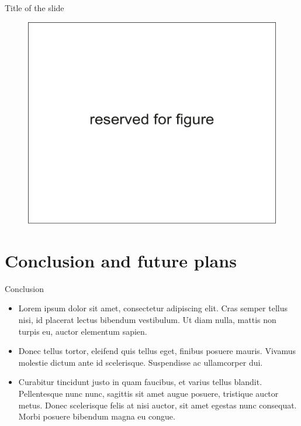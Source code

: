 \documentclass[russian,12pt,aspectratio=169,xcolor=table]{beamer}
\begin{document}
\begin{frame}{Title of the slide}
\begin{minipage}{.32\textwidth}
  \end{minipage}
  \begin{minipage}{.32\textwidth}
    \begin{figure}
      \centering
      \includegraphics[width=\textwidth]{img/5}
    \end{figure}
  \end{minipage}
\end{frame}


\section{Conclusion and future plans}
	
\begin{frame}{Conclusion}
  \begin{itemize}
    \item Lorem ipsum dolor sit amet, consectetur adipiscing elit. Cras semper tellus nisi, id placerat lectus bibendum vestibulum. Ut diam nulla, mattis non turpis eu, auctor elementum sapien.
    \item Donec tellus tortor, eleifend quis tellus eget, finibus posuere mauris. Vivamus molestie dictum ante id scelerisque. Suspendisse ac ullamcorper dui.
    \item Curabitur tincidunt justo in quam faucibus, et varius tellus blandit. Pellentesque nunc nunc, sagittis sit amet augue posuere, tristique auctor metus. Donec scelerisque felis at nisi auctor, sit amet egestas nunc consequat. Morbi posuere bibendum magna eu congue.
  \end{itemize}
\end{frame}
\end{document}
